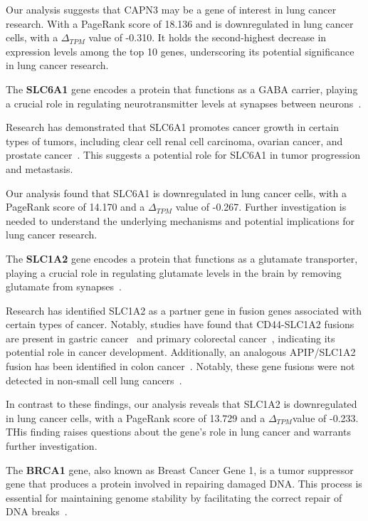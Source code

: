 Our analysis suggests that CAPN3 may be a gene of interest in lung cancer research.
With a PageRank score of 18.136 and is downregulated in lung cancer cells,
with a $\Delta_{TPM}$ value of -0.310.
It holds the second-highest decrease in expression levels among the top 10 genes,
underscoring its potential significance in lung cancer research.
\newline

The \textbf{SLC6A1} gene encodes a protein that functions as a GABA carrier,
playing a crucial role in regulating neurotransmitter levels at synapses between neurons~\cite{Chen2020SLC6A1}.

Research has demonstrated that SLC6A1 promotes cancer growth in certain types of tumors,
including clear cell renal cell carcinoma, ovarian cancer, and prostate cancer~\cite{Chen2020SLC6A1}.
This suggests a potential role for SLC6A1 in tumor progression and metastasis.

Our analysis found that SLC6A1 is downregulated in lung cancer cells,
with a PageRank score of 14.170 and a $\Delta_{TPM}$ value of -0.267.
Further investigation is needed to understand the underlying mechanisms and potential implications for lung cancer research.
\newline

The \textbf{SLC1A2} gene encodes a protein that functions as a glutamate transporter,
playing a crucial role in regulating glutamate levels in the brain by removing glutamate from synapses~\cite{NCBI2017SLC1A2}.

Research has identified SLC1A2 as a partner gene in fusion genes associated with certain types of cancer.
Notably, studies have found that CD44-SLC1A2 fusions are present in gastric cancer~\cite{Tao2011CD44} and
primary colorectal cancer~\cite{Shinmura2015CD44}, indicating its potential role in cancer development.
Additionally, an analogous APIP/SLC1A2 fusion has been identified in colon cancer~\cite{Giacomini2013Breakpoint}.
Notably, these gene fusions were not detected in non-small cell lung cancers~\cite{Shinmura2015CD44}.

In contrast to these findings, our analysis reveals that SLC1A2 is downregulated in lung cancer cells,
with a PageRank score of 13.729 and a $\Delta_{TPM}$value of -0.233.
THis finding raises questions about the gene's role in lung cancer and warrants further investigation.
\newline

The \textbf{BRCA1} gene, also known as Breast Cancer Gene 1, is a tumor suppressor gene
that produces a protein involved in repairing damaged DNA\@.
This process is essential for maintaining genome stability by facilitating the correct repair of DNA breaks~\cite{NCI2020BRCA1}.

